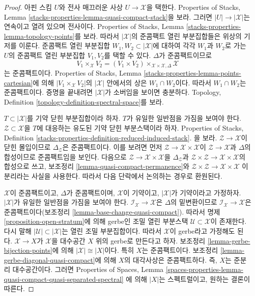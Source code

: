 \begin{proof}
아핀 스킴 $U$와 전사 매끄러운 사상 $U \to \mathcal{X}$을 택한다.
Properties of Stacks, Lemma
\ref{stacks-properties-lemma-quasi-compact-stack}을 보라. 그러면
$|U| \to |\mathcal{X}|$는 연속이고 열려 있으며 전사이다. Properties of
Stacks, Lemma \ref{stacks-properties-lemma-topology-points}를 보라. 따라서
$|\mathcal{X}|$의 준콤팩트 열린 부분집합들은 위상의 기저를 이룬다.
준콤팩트 열린 부분집합 $W_1, W_2 \subset |\mathcal{X}|$에 대하여 각각
$W_1$과 $W_2$로 가는 $U$의 준콤팩트 열린 부분집합 $V_1, V_2$를 택할
수 있다.%
$\Delta$가 준콤팩트이므로
$$
V_1 \times_\mathcal{X} V_2 =
(V_1 \times V_2) \times_{\mathcal{X} \times \mathcal{X}, \Delta} \mathcal{X}
$$
는 준콤팩트이다. Properties of Stacks, Lemma
\ref{stacks-properties-lemma-points-cartesian}에 의해
$|V_1 \times_\mathcal{X} V_2|$의 $|\mathcal{X}|$ 안에서의 상은
$W_1 \cap W_2$이다.%
따라서 $W_1 \cap W_2$는 준콤팩트이다. 증명을 끝내려면
$|\mathcal{X}|$가 소버임을 보이면 충분하다. Topology, Definition
\ref{topology-definition-spectral-space}를 보라.

\medskip\noindent
$T \subset |\mathcal{X}|$를 기약 닫힌 부분집합이라 하자. $T$가 유일한
일반점을 가짐을 보여야 한다. $\mathcal{Z} \subset \mathcal{X}$을 $T$에
대응하는 유도된 기약 닫힌 부분스택이라 하자. Properties of Stacks,
Definition
\ref{stacks-properties-definition-reduced-induced-stack}.
을 보라. $\mathcal{Z} \to \mathcal{X}$이 닫힌 몰입이므로
$\Delta_\mathcal{Z}$은 준콤팩트이다. 이를 보려면 먼저
$\mathcal{Z} \to \mathcal{X} \times \mathcal{X}$이
$\mathcal{Z} \to \mathcal{X}$과 $\Delta$의 합성이므로 준콤팩트임을
보인다. 다음으로 $\mathcal{Z} \to \mathcal{X} \times \mathcal{X}$을
$\Delta_\mathcal{Z}$과
$\mathcal{Z} \times \mathcal{Z} \to \mathcal{X} \times \mathcal{X}$의
합성으로 쓰고, 보조정리 \ref{lemma-quasi-compact-permanence}와
$\mathcal{Z} \times \mathcal{Z} \to \mathcal{X} \times \mathcal{X}$
이 분리라는 사실을 사용한다. 따라서 다음 단락에서 논의하는 경우로
환원된다.

\medskip\noindent
$\mathcal{X}$이 준콤팩트이고, $\Delta$가 준콤팩트이며,
$\mathcal{X}$이 기약이고, $|\mathcal{X}|$가 기약이라고 가정하자.
$|\mathcal{X}|$가 유일한 일반점을 가짐을 보여야 한다.
$\mathcal{I}_\mathcal{X} \to \mathcal{X}$은 $\Delta$의 밑변환이므로
$\mathcal{I}_\mathcal{X} \to \mathcal{X}$은 준콤팩트이다(보조정리
\ref{lemma-base-change-quasi-compact}). 따라서 명제
\ref{proposition-open-stratum}에 의해 gerbe인 조밀 열린 부분스택
$\mathcal{U} \subset \mathcal{X}$이 존재한다. 다시 말해
$|\mathcal{U}| \subset |\mathcal{X}|$는 열린 조밀 부분집합이다. 따라서
$\mathcal{X}$이 gerbe라고 가정해도 된다. $\mathcal{X} \to X$가
$\mathcal{X}$을 대수공간 $X$ 위의 gerbe로 만든다고 하자. 보조정리
\ref{lemma-gerbe-bijection-points}에 의해
$|\mathcal{X}| \cong |X|$이다. 특히 $X$는 준콤팩트이다. 보조정리
\ref{lemma-gerbe-diagonal-quasi-compact}에 의해 $X$의 대각사상은
준콤팩트하다. 즉, $X$는 준분리 대수공간이다. 그러면 Properties of
Spaces, Lemma
\ref{spaces-properties-lemma-quasi-compact-quasi-separated-spectral}
에 의해 $|X|$는 스펙트럴이고, 원하는 결론이 따른다.
\end{proof}

